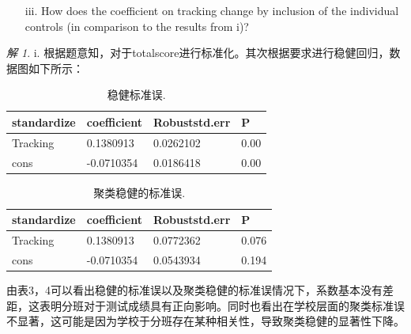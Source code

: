 \documentclass[a4paper]{ctexart}
\theoremstyle{remark}
\newtheorem*{solution}{解}
\begin{document}
\begin{itemize}
\begin{enumerate}
\item[iii.]  How does the coefficient on tracking change by inclusion of the individual controls (in comparison to the results from i)?
\end{enumerate}



\begin{solution}
    i. 根据题意知，对于totalscore进行标准化。其次根据要求进行稳健回归，数据图如下所示：\\
    \begin{table}[h]
        \centering
        \begin{threeparttable}%
            \begin{tabular}{llll}%
                \hline
                standardize & coefficient & Robuststd.err & P \\
                \hline
                Tracking & 0.1380913 & 0.0262102 & 0.00 \\
                cons  &  -0.0710354 & 0.0186418  & 0.00\\
                \hline
            \end{tabular} 
        \end{threeparttable}
        \caption{\label{font-table} 稳健标准误. }
    \end{table}

    \begin{table}[h]
        \centering
        \begin{threeparttable}%
            \begin{tabular}{llll}%
                \hline
                standardize & coefficient & Robuststd.err & P \\
                \hline
                Tracking & 0.1380913 & 0.0772362 & 0.076 \\
                cons  & -0.0710354 & 0.0543934 & 0.194\\
                \hline
            \end{tabular} 
        \end{threeparttable}
        \caption{\label{font-table} 聚类稳健的标准误. }
    \end{table}
    由表3，4可以看出稳健的标准误以及聚类稳健的标准误情况下，系数基本没有差距，这表明分班对于测试成绩具有正向影响。同时也看出在学校层面的聚类标准误不显著，这可能是因为学校于分班存在某种相关性，导致聚类稳健的显著性下降。



\end{solution}
\end{itemize}
\end{document}

